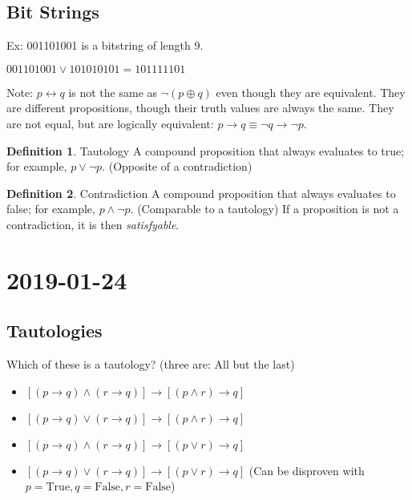 \documentclass{article}
\theoremstyle{definition}
\newtheorem{definition}{Definition}[section]
\begin{document}
\subsection*{Bit Strings}
Ex: 001101001 is a bitstring of length 9.

$001101001 \lor 101010101 = 101111101$

Note: $p \leftrightarrow q$ is not the same as $\neg (p \oplus q)$ even though they are equivalent. They are different propositions, though their truth values are always the same. They are not equal, but are logically equivalent: $p \rightarrow q \equiv \neg q \rightarrow \neg p$.

\begin{definition}{Tautology}
  A compound proposition that always evaluates to true; for example, $p \lor \neg p$. (Opposite of a contradiction)
\end{definition}

\begin{definition}{Contradiction}
  A compound proposition that always evaluates to false; for example, $p \land \neg p$. (Comparable to a tautology) If a proposition is not a contradiction, it is then \textit{satisfyable}.
\end{definition}

\section*{2019-01-24}

\subsection*{Tautologies}

Which of these is a tautology? (three are: All but the last)

\begin{itemize}
  \item $[(p \rightarrow q) \land (r \rightarrow q)] \rightarrow [(p \land r) \rightarrow q]$
  \item $[(p \rightarrow q) \lor  (r \rightarrow q)] \rightarrow [(p \land r) \rightarrow q]$
  \item $[(p \rightarrow q) \land  (r \rightarrow q)] \rightarrow [(p \lor r) \rightarrow q]$
  \item $[(p \rightarrow q) \lor  (r \rightarrow q)] \rightarrow [(p \lor r) \rightarrow q]$ (Can be disproven with $p = \text{True}, q = \text{False}, r = \text{False}$)
\end{itemize}
\end{document}
